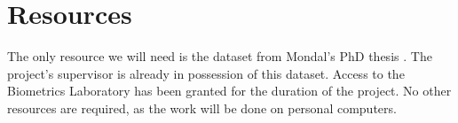 \documentclass[informationsecurity]{gucmasterproject}
\begin{document}
%           

\section{Resources}
\label{sec:milestones-resources}
The only resource we will need is the dataset from Mondal's PhD thesis \cite{mondal}. The project's supervisor is already in possession of this dataset.
Access to the Biometrics Laboratory has been granted for the duration of the project.
No other resources are required, as the work will be done on personal computers.
\end{document}
